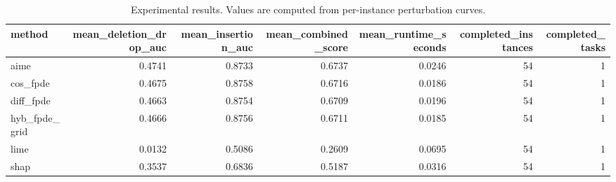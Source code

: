 \begin{table}[t]
\caption{Experimental results. Values are computed from per-instance perturbation curves.}
\label{tab:main_results_computed}
\centering
\begin{tabular}{lrrrrrr}
\toprule
method & mean\_deletion\_drop\_auc & mean\_insertion\_auc & mean\_combined\_score & mean\_runtime\_seconds & completed\_instances & completed\_tasks \\
\midrule
aime & 0.4741 & 0.8733 & 0.6737 & 0.0246 & 54 & 1 \\
cos\_fpde & 0.4675 & 0.8758 & 0.6716 & 0.0186 & 54 & 1 \\
diff\_fpde & 0.4663 & 0.8754 & 0.6709 & 0.0196 & 54 & 1 \\
hyb\_fpde\_grid & 0.4666 & 0.8756 & 0.6711 & 0.0185 & 54 & 1 \\
lime & 0.0132 & 0.5086 & 0.2609 & 0.0695 & 54 & 1 \\
shap & 0.3537 & 0.6836 & 0.5187 & 0.0316 & 54 & 1 \\
\bottomrule
\end{tabular}

\end{table}
